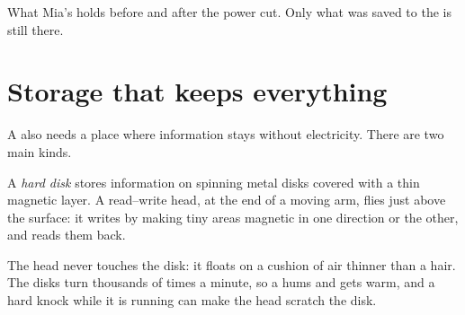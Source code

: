 \begin{omfigure}

{\small What Mia's  holds before and after the power cut. Only what
was saved to the  is still there.}
\label{fig:g4:memory-and-storage:power}
\end{omfigure}

\section{Storage that keeps everything}

A  also needs a place where information stays without electricity.
There are two main kinds.

\begin{definition}\label{def:g4:memory-and-storage:hard-disk}
A \emph{hard disk} stores information on spinning metal
disks covered with a thin magnetic layer. A read--write head, at the end of a
moving arm, flies just above the surface: it writes by making tiny areas
magnetic in one direction or the other, and reads them back.
\end{definition}

The head never touches the disk: it floats on a cushion of air thinner than a
hair. The disks turn thousands of times a minute, so a  hums and gets
warm, and a hard knock while it is running can make the head scratch the disk.

